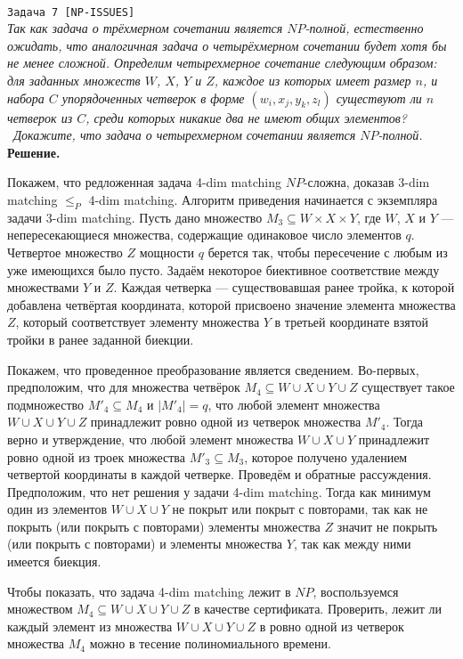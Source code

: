 \documentclass[10pt]{article}
\begin{document}
\ \\[0.5 cm]
{\large\texttt{Задача 7 [NP-ISSUES]}}
\ \\[0.2cm]
\textit{
Так как задача о трёхмерном сочетании является $NP$-полной, естественно ожидать, что аналогичная задача о четырёхмерном сочетании будет хотя бы не менее сложной. Определим четырехмерное сочетание следующим образом: для заданных множеств $W$, $X$, $Y$ и $Z$, каждое из которых имеет размер $n$, и набора $C$ упорядоченных четверок в форме $(w_i, x_j, y_k , z_l)$ существуют ли $n$ четверок из $C$, среди которых никакие два не имеют общих элементов?
\\ \
Докажите, что задача о четырехмерном сочетании является $NP$-полной.
}
\ \\[0.2cm]
\textbf{Решение.} 

\par Покажем, что редложенная задача 4-dim matching $NP$-сложна, доказав 3-dim matching $\leq_P$ 4-dim matching. Алгоритм приведения начинается с экземпляра задачи 3-dim matching. Пусть дано множество  $M_3 \subseteq W\times X\times Y$, где $W$, $X$ и $Y$ --- непересекающиеся множества, содержащие одинаковое число элементов $q$. Четвертое множество $Z$ мощности $q$ берется так, чтобы пересечение с любым из уже имеющихся было пусто. Задаём некоторое биективное соответствие между множествами $Y$ и $Z$. Каждая четверка --- существовавшая ранее тройка, к которой добавлена четвёртая координата, которой присвоено значение элемента множества $Z$, который соответствует элементу множества $Y$ в третьей координате взятой тройки в ранее заданной биекции.
\medskip\par Покажем, что проведенное преобразование является сведением. Во-первых, предположим, что для множества четвёрок $M_4\subseteq W\cup X\cup Y\cup Z$ существует такое подмножество $M'_4\subseteq M_4$ и $|M'_4|=q$, что любой элемент множества $W\cup X\cup Y\cup Z$ принадлежит ровно одной из четверок множества $M'_4$. Тогда верно и утверждение, что любой элемент множества $W\cup X\cup Y$ принадлежит ровно одной из троек множества $M'_3\subseteq M_3$, которое получено удалением четвертой координаты в каждой четверке. Проведём и обратные рассуждения. Предположим, что нет решения у задачи 4-dim matching. Тогда как минимум один из элементов $W\cup X\cup Y$ не покрыт или покрыт с повторами, так как не покрыть (или покрыть с повторами) элементы множества $Z$ значит не покрыть (или покрыть с повторами) и элементы множества $Y$, так как между ними имеется биекция.
\medskip\par Чтобы показать, что задача 4-dim matching лежит в $NP$, воспользуемся множеством $M_4\subseteq W\cup X\cup Y\cup Z$ в качестве сертификата. Проверить, лежит ли каждый элемент из множества $W\cup X\cup Y\cup Z$ в ровно одной из четверок множества $M_4$ можно в тесение полиномиального времени.
\end{document}
